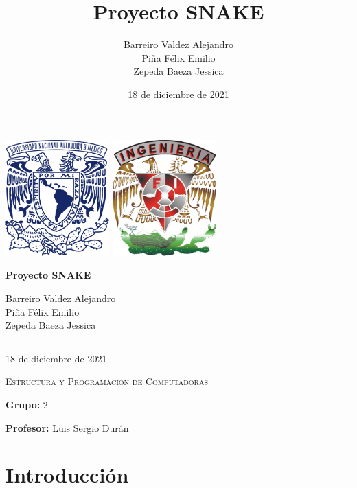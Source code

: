 \documentclass[12pt]{article}
\title{Proyecto SNAKE}
\author{Barreiro Valdez Alejandro\\Piña Félix Emilio\\Zepeda Baeza Jessica}
\date{18 de diciembre de 2021}
\begin{document}
\begin{center}
    \includegraphics[width = 4cm]{img/logo/unam-escudo-azul.png}
    \hspace{7cm}
    \includegraphics[width = 4cm]{img/logo/fi.jpg}
    \vspace{4cm}
    
    \huge
    \textbf{Proyecto SNAKE}
    \vspace{.5cm}
    
    \LARGE
    Barreiro Valdez Alejandro\\Piña Félix Emilio\\Zepeda Baeza Jessica
    
    \noindent\rule{10cm}{0.4pt}
    \vspace{4cm}
    
    \large
    18 de diciembre de 2021
    \vspace{1cm}
    
    \textsc{\Large Estructura y Programación de Computadoras}
    \vspace{.5cm}
    
    \flushleft
    \textbf{Grupo:} 2
    
    \textbf{Profesor:} Luis Sergio Durán
\end{center}

\newpage

\section*{Introducción}
\end{document}
